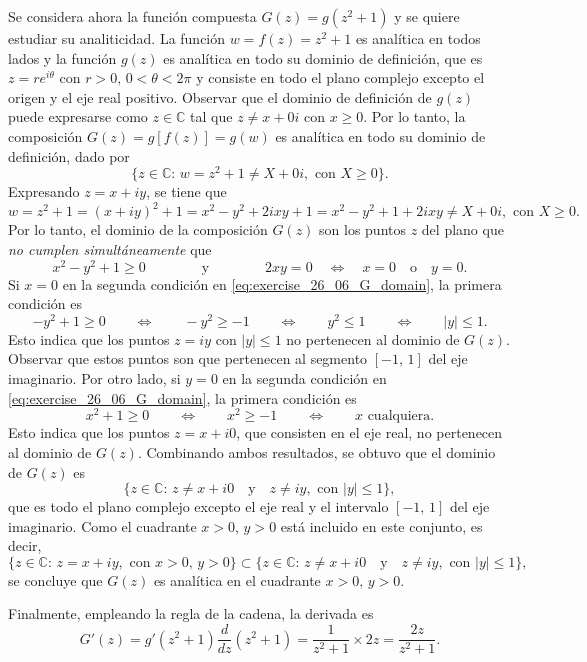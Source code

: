 \documentclass[a4paper]{report}
\begin{document}
 Se considera ahora la función compuesta \(G(z)=g(z^2+1)\) y se quiere estudiar su analiticidad. La función \(w=f(z)=z^2+1\) es analítica en todos lados y la función \(g(z)\) es analítica en todo su dominio de definición, que es \(z=re^{i\theta}\) con \(r>0,\,0<\theta<2\pi\) y consiste en todo el plano complejo excepto el origen y el eje real positivo. Observar que el dominio de definición de \(g(z)\) puede expresarse como \(z\in\mathbb{C}\) tal que \(z\neq x+0i\) con \(x\geq0\). Por lo tanto, la composición \(G(z)=g[f(z)]=g(w)\) es analítica en todo su dominio de definición, dado por
\[
 \{z\in\mathbb{C}:\,w=z^2+1\neq X+0i,\textrm{ con }X\geq0\}.
\]
Expresando \(z=x+iy\), se tiene que
\[
 w=z^2+1=(x+iy)^2+1=x^2-y^2+2ixy+1=x^2-y^2+1+2ixy\neq X+0i,\textrm{ con }X\geq0.
\]
Por lo tanto, el dominio de la composición \(G(z)\) son los puntos \(z\) del plano que \emph{no cumplen simultáneamente} que
\begin{equation}\label{eq:exercise_26_06_G_domain}
  x^2-y^2+1\geq0
 \qquad\qquad\textrm{y}\qquad\qquad
 2xy=0\quad\Leftrightarrow\quad
 x=0\quad\textrm{o}\quad y=0.
\end{equation}
Si \(x=0\) en la segunda condición en \ref{eq:exercise_26_06_G_domain}, la primera condición es
\[
 -y^2+1\geq0\qquad\Leftrightarrow\qquad-y^2\geq-1\qquad\Leftrightarrow\qquad y^2\leq1
 \qquad\Leftrightarrow\qquad|y|\leq1.
\]
Esto indica que los puntos \(z=iy\) con \(|y|\leq1\) no pertenecen al dominio de \(G(z)\). Observar que estos puntos son que pertenecen al segmento \([-1,\,1]\) del eje imaginario. Por otro lado, si \(y=0\) en la segunda condición en \ref{eq:exercise_26_06_G_domain}, la primera condición es
\[
 x^2+1\geq0\qquad\Leftrightarrow\qquad x^2\geq-1\qquad\Leftrightarrow\qquad x\textrm{ cualquiera}.
\]
Esto indica que los puntos \(z=x+i0\), que consisten en el eje real, no pertenecen al dominio de \(G(z)\). Combinando ambos resultados, se obtuvo que el dominio de \(G(z)\) es
\[
 \{z\in\mathbb{C}:\,z\neq x+i0\quad\textrm{y}\quad z\neq iy,\textrm{ con }|y|\leq1\},
\]
que es todo el plano complejo excepto el eje real y el intervalo \([-1,\,1]\) del eje imaginario. Como el cuadrante \(x>0,\,y>0\) está incluido en este conjunto, es decir,
\[
 \{z\in\mathbb{C}:\,z=x+iy,\textrm{ con }x>0,\,y>0\}\subset\{z\in\mathbb{C}:\,z\neq x+i0\quad\textrm{y}\quad z\neq iy,\textrm{ con }|y|\leq1\},
\]
se concluye que \(G(z)\) es analítica en el cuadrante \(x>0,\,y>0\).

Finalmente, empleando la regla de la cadena, la derivada es
\[
 G'(z)=g'(z^2+1)\frac{d}{dz}(z^2+1)=\frac{1}{z^2+1}\times2z=\frac{2z}{z^2+1}.
\]
\end{document}
